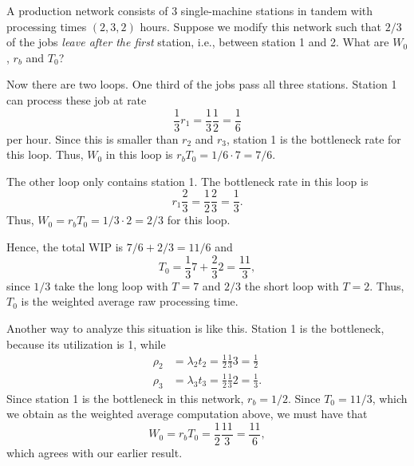 \begin{exercise}
  A production network consists of 3 single-machine stations in tandem
  with processing times $(2, 3, 2)$ hours.  Suppose we modify this
  network such that $2/3$ of the jobs \emph{ leave after the first}
  station, i.e., between station 1 and 2.  What are $W_0$, $r_b$ and
  $T_0$? 
\begin{solution}
  Now there are two loops. One third of the jobs pass all three
  stations. Station 1 can process these job at rate 
  \begin{equation*}
\frac13 r_1 = \frac 13 \frac 12=\frac 16
  \end{equation*}
  per hour. Since this is smaller than $r_2$ and $r_3$, station 1 is
  the bottleneck rate for this loop. Thus, $W_0$ in this loop is
  $r_b T_0 = 1/6\cdot 7 = 7/6$.

  The other loop only contains station 1. The bottleneck rate in this
  loop is 
  \begin{equation*}
r_1\frac23 = \frac12\frac23 = \frac13. 
  \end{equation*}
Thus,
  $W_0 = r_b T_0 = 1/3\cdot 2 = 2/3$ for this loop. 

Hence, the total WIP is $7/6 + 2/3 = 11/6$ and
\begin{equation*}
T_0 = \frac13  7 + \frac 23  2=\frac{11}3,
\end{equation*}
since $1/3$ take the long loop with $T=7$ and $2/3$ the short loop
with $T=2$. Thus, $T_0$ is the weighted average raw processing time.

Another way to analyze this situation is like this. Station 1 is the
bottleneck, because its utilization is 1, while
\begin{align*}
  \rho_2 &= \lambda_2 t_2 = \frac12\frac13 3 = \frac 12\\
  \rho_3 &= \lambda_3 t_3 = \frac12\frac13 2 = \frac 13.
\end{align*}
Since station 1 is the bottleneck in this network, $r_b=1/2$. Since
$T_0 = 11/3$, which we obtain as the weighted average computation
above, we must have that 
\begin{equation*}
W_0 = r_b T_0 = \frac12\frac{11}3 = \frac{11}6, 
\end{equation*}
which agrees with our earlier result.
\end{solution}
\end{exercise}


